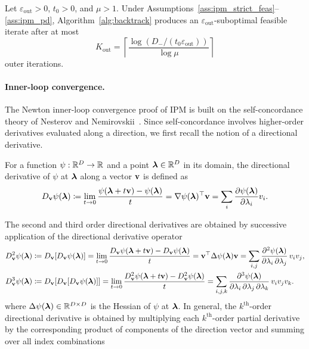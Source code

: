 \begin{theorem}\label{thm:outer_convergence}
	Let $\varepsilon_\text{out}>0$, $t_0>0$, and $\mu>1$. Under Assumptions~\ref{ass:ipm_strict_feas}--\ref{ass:ipm_pd}, Algorithm~\ref{alg:backtrack} produces an $\varepsilon_\text{out}$-suboptimal feasible iterate after at most
	\begin{equation}\label{eq:outer_iters}
		K_\text{out} = \left\lceil \frac{\log\!\left(D_-/(t_0\varepsilon_\text{out})\right)}{\log\mu}\right\rceil
	\end{equation}
	outer iterations.
\end{theorem}

\paragraph{Inner-loop convergence.} The Newton inner-loop convergence proof of IPM is built on the self-concordance theory of Nesterov and Nemirovskii~\cite{nesterov1994interior}. Since self-concordance involves higher-order derivatives evaluated along a direction, we first recall the notion of a directional derivative. 
\begin{definition}\label{def:dir_deriv}
For a function $\psi: \mathbb{R}^D\to\mathbb{R}$ and a point $\boldsymbol{\lambda}\in\mathbb{R}^D$ in its domain, the directional derivative of $\psi$ at $\boldsymbol{\lambda}$ along a vector $\mathbf{v}$ is defined as
\begin{equation}
D_{\mathbf{v}}\psi(\boldsymbol{\lambda})\coloneqq \lim_{t\to0} \frac{\psi(\boldsymbol{\lambda}+t\mathbf{v})-\psi(\boldsymbol{\lambda})}{t} = \nabla\psi(\boldsymbol{\lambda})^\top\mathbf{v} = \sum_i \frac{\partial\psi(\boldsymbol{\lambda})}{\partial \lambda_i}v_i.
\end{equation}
\end{definition}
The second and third order directional derivatives are obtained by successive application of the directional derivative operator
\begin{align}
D_{\mathbf{v}}^2 \psi(\boldsymbol{\lambda}) &\coloneqq D_{\mathbf{v}}[D_{\mathbf{v}}\psi(\boldsymbol{\lambda})]
= \lim_{t\to0} \frac{D_{\mathbf{v}}\psi(\boldsymbol{\lambda}+t\mathbf{v})-D_{\mathbf{v}}\psi(\boldsymbol{\lambda})}{t}
= \mathbf{v}^\top\Delta\psi(\boldsymbol{\lambda})\mathbf{v}=\sum_{i,j}\frac{\partial^2\psi(\boldsymbol{\lambda})}{\partial \lambda_i\,\partial \lambda_j}\,v_i v_j, \\
D_{\mathbf{v}}^3 \psi(\boldsymbol{\lambda}) &\coloneqq D_{\mathbf{v}}[D_{\mathbf{v}}[D_{\mathbf{v}}\psi(\boldsymbol{\lambda})]]
= \lim_{t\to0} \frac{D_{\mathbf{v}}^2\psi(\boldsymbol{\lambda}+t\mathbf{v})-D_{\mathbf{v}}^2\psi(\boldsymbol{\lambda})}{t}
= \sum_{i,j,k}\frac{\partial^3\psi(\boldsymbol{\lambda})}{\partial \lambda_i\,\partial \lambda_j\,\partial \lambda_k}\,v_i v_j v_k.
\end{align}
where $\Delta\psi(\boldsymbol{\lambda})\in\mathbb{R}^{D\times D}$ is the Hessian of $\psi$ at $\boldsymbol{\lambda}$. In general, the $k^\text{th}$-order directional derivative is obtained by multiplying each $k^\text{th}$-order partial derivative by the corresponding product of components of the direction vector and summing over all index combinations
